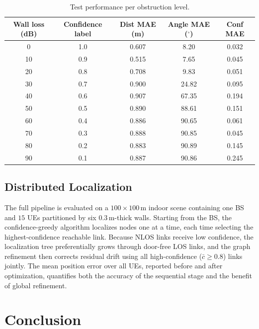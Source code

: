 \documentclass[conference]{IEEEtran}
\begin{document}
\begin{table}[t]
\centering
\caption{Test performance per obstruction level.}
\label{tab:levels}
\begin{tabular}{ccccc}
\toprule
Wall loss (dB) & Confidence label & Dist MAE (m) & Angle MAE ($^{\circ}$) & Conf MAE \\
\midrule
0   & 1.0 & 0.607 & 8.20  & 0.032 \\
10  & 0.9 & 0.515 & 7.65  & 0.045 \\
20  & 0.8 & 0.708 & 9.83  & 0.051 \\
30  & 0.7 & 0.900 & 24.82 & 0.095 \\
40  & 0.6 & 0.907 & 67.35 & 0.194 \\
50  & 0.5 & 0.890 & 88.61 & 0.151 \\
60  & 0.4 & 0.886 & 90.65 & 0.061 \\
70  & 0.3 & 0.888 & 90.85 & 0.045 \\
80  & 0.2 & 0.883 & 90.89 & 0.145 \\
90  & 0.1 & 0.887 & 90.86 & 0.245 \\
\bottomrule
\end{tabular}
\end{table}

\subsection{Distributed Localization}
The full pipeline is evaluated on a $100\times100$\,m indoor scene containing
one BS and $15$ UEs partitioned by six $0.3$\,m-thick walls. Starting from the
BS, the confidence-greedy algorithm localizes nodes one at a time, each time
selecting the highest-confidence reachable link. Because NLOS links receive low
confidence, the localization tree preferentially grows through door-free LOS
links, and the graph refinement then corrects residual drift using all
high-confidence ($\bar{c}\ge0.8$) links jointly. The mean position error over
all UEs, reported before and after optimization, quantifies both the accuracy
of the sequential stage and the benefit of global refinement.

\section{Conclusion}
\label{sec:conclusion}
\end{document}
